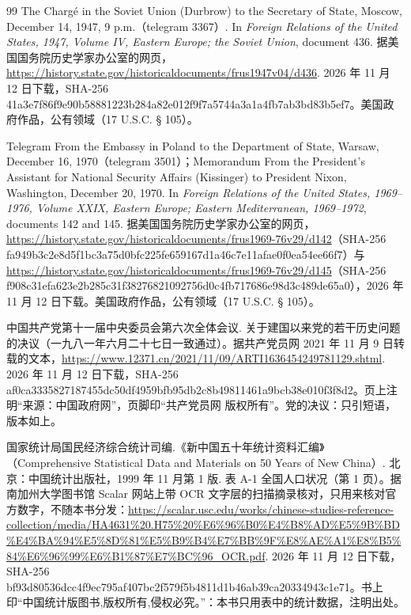 \begin{thebibliography}{99}
 The Chargé in the Soviet Union (Durbrow) to the Secretary of State, Moscow, December 14, 1947, 9 p.m.（telegram 3367）. In \emph{Foreign Relations of the United States, 1947, Volume IV, Eastern Europe; the Soviet Union}, document 436. 据美国国务院历史学家办公室的网页，\url{https://history.state.gov/historicaldocuments/frus1947v04/d436}. 2026 年 11 月 12 日下载，SHA-256 41a3e7f86f9e90b58881223b284a82e012f9f7a5744a3a1a4fb7ab3bd83b5ef7。美国政府作品，公有领域（17 U.S.C. § 105）。

 Telegram From the Embassy in Poland to the Department of State, Warsaw, December 16, 1970（telegram 3501）；Memorandum From the President's Assistant for National Security Affairs (Kissinger) to President Nixon, Washington, December 20, 1970. In \emph{Foreign Relations of the United States, 1969--1976, Volume XXIX, Eastern Europe; Eastern Mediterranean, 1969--1972}, documents 142 and 145. 据美国国务院历史学家办公室的网页，\url{https://history.state.gov/historicaldocuments/frus1969-76v29/d142}（SHA-256 fa949b3c2e8d5f1bc3a75d0bfc225fe659167d1a46c7e11afae0f0ea54ee66f7）与 \url{https://history.state.gov/historicaldocuments/frus1969-76v29/d145}（SHA-256 f908c31efa623e2b285c31f38276821092756d0c4fb717686e98d3c489de65a0），2026 年 11 月 12 日下载。美国政府作品，公有领域（17 U.S.C. § 105）。

 中国共产党第十一届中央委员会第六次全体会议. 关于建国以来党的若干历史问题的决议（一九八一年六月二十七日一致通过）。据共产党员网 2021 年 11 月 9 日转载的文本，\url{https://www.12371.cn/2021/11/09/ARTI1636454249781129.shtml}. 2026 年 11 月 12 日下载，SHA-256 af0ca3335827187455dc50df4959bfb95db2c8b49811461a9bcb38e010f3f8d2。页上注明“来源：中国政府网”，页脚印“共产党员网 版权所有”。党的决议：只引短语，版本如上。

 国家统计局国民经济综合统计司编.《新中国五十年统计资料汇编》（Comprehensive Statistical Data and Materials on 50 Years of New China）. 北京：中国统计出版社，1999 年 11 月第 1 版. 表 A-1 全国人口状况（第 1 页）。据南加州大学图书馆 Scalar 网站上带 OCR 文字层的扫描摘录核对，只用来核对官方数字，不随本书分发：\url{https://scalar.usc.edu/works/chinese-studies-reference-collection/media/HA4631\%20.H75\%20\%E6\%96\%B0\%E4\%B8\%AD\%E5\%9B\%BD\%E4\%BA\%94\%E5\%8D\%81\%E5\%B9\%B4\%E7\%BB\%9F\%E8\%AE\%A1\%E8\%B5\%84\%E6\%96\%99\%E6\%B1\%87\%E7\%BC\%96_OCR.pdf}. 2026 年 11 月 12 日下载，SHA-256 bf93d80536dcc4f9ec795af407bc2f579f5b4811d1b46ab39ca20334943c1e71。书上印“中国统计版图书,版权所有,侵权必究。”：本书只用表中的统计数据，注明出处。


\end{thebibliography}
